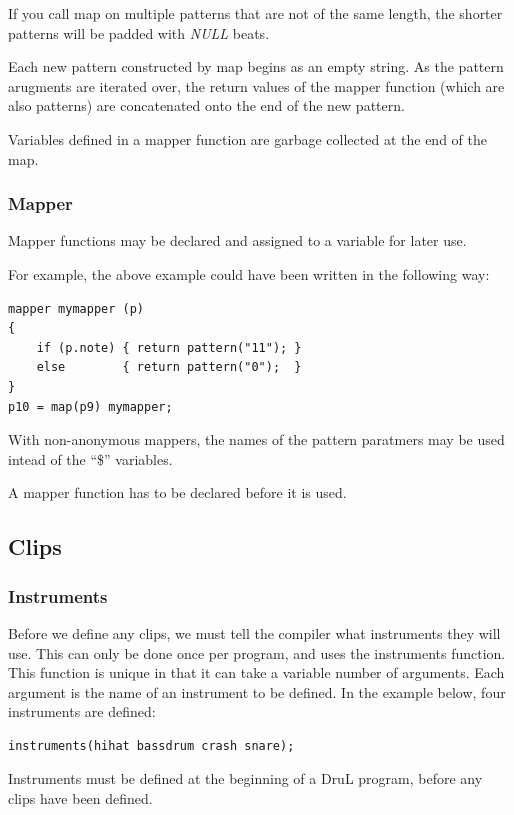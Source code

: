 \documentclass[11pt,twoside]{article}
\begin{document}
If you call map on multiple patterns that are not of the same length, the shorter patterns will be padded with \textit{NULL} beats.

Each new pattern constructed by map begins as an empty string.  As the pattern arugments are iterated over, the return values of the mapper function (which are also patterns) are concatenated onto the end of the new pattern.

Variables defined in a mapper function are garbage collected at the end of the map.

\subsubsection{Mapper}

Mapper functions may be declared and assigned to a variable for later use.

For example, the above example could have been written in the following way:
\begin{verbatim}
mapper mymapper (p)
{
    if (p.note) { return pattern("11"); }
    else        { return pattern("0");  }
}
p10 = map(p9) mymapper;
\end{verbatim}
With non-anonymous mappers, the names of the pattern paratmers may be used intead of the ``\$'' variables.

A mapper function has to be declared before it is used.





\subsection{Clips}

\subsubsection{Instruments}

Before we define any clips, we must tell the compiler what instruments they will use.
This can only be done once per program, and uses the instruments function.  This function is unique in that it can take a variable number of arguments.  Each argument is the name of an instrument to be defined.  In the example below, four instruments are defined:

\begin{verbatim}
instruments(hihat bassdrum crash snare);
\end{verbatim}

Instruments must be defined at the beginning of a DruL program, before any clips have been defined.
\end{document}
